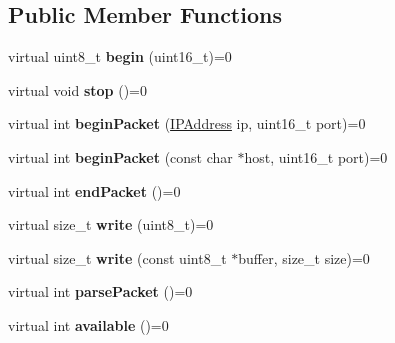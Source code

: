 \subsection*{Public Member Functions}
\begin{DoxyCompactItemize}
\item 
\hypertarget{class_u_d_p_afc18a5689a3dc92e5f5fb740e08ba1f9}{}virtual uint8\+\_\+t {\bfseries begin} (uint16\+\_\+t)=0\label{class_u_d_p_afc18a5689a3dc92e5f5fb740e08ba1f9}

\item 
\hypertarget{class_u_d_p_a0e4696e1b2e485970c0aca6216a1a4ac}{}virtual void {\bfseries stop} ()=0\label{class_u_d_p_a0e4696e1b2e485970c0aca6216a1a4ac}

\item 
\hypertarget{class_u_d_p_a41344aa0d287135b6dfa9b180e2e446b}{}virtual int {\bfseries begin\+Packet} (\hyperlink{class_i_p_address}{I\+P\+Address} ip, uint16\+\_\+t port)=0\label{class_u_d_p_a41344aa0d287135b6dfa9b180e2e446b}

\item 
\hypertarget{class_u_d_p_adb47bf5e8a65ed5240374b4036c69f3d}{}virtual int {\bfseries begin\+Packet} (const char $\ast$host, uint16\+\_\+t port)=0\label{class_u_d_p_adb47bf5e8a65ed5240374b4036c69f3d}

\item 
\hypertarget{class_u_d_p_ab3d794999eab13727b155da81f55858f}{}virtual int {\bfseries end\+Packet} ()=0\label{class_u_d_p_ab3d794999eab13727b155da81f55858f}

\item 
\hypertarget{class_u_d_p_ad913d57b20d77fdbfbc63a5646de345e}{}virtual size\+\_\+t {\bfseries write} (uint8\+\_\+t)=0\label{class_u_d_p_ad913d57b20d77fdbfbc63a5646de345e}

\item 
\hypertarget{class_u_d_p_afa7e3894d353b62c74b69e8cb39d303a}{}virtual size\+\_\+t {\bfseries write} (const uint8\+\_\+t $\ast$buffer, size\+\_\+t size)=0\label{class_u_d_p_afa7e3894d353b62c74b69e8cb39d303a}

\item 
\hypertarget{class_u_d_p_adab1e167381c58afcec04f40fb1c57e2}{}virtual int {\bfseries parse\+Packet} ()=0\label{class_u_d_p_adab1e167381c58afcec04f40fb1c57e2}

\item 
\hypertarget{class_u_d_p_a5598f32d2ca6a3222b00b1ff47e8136c}{}virtual int {\bfseries available} ()=0\label{class_u_d_p_a5598f32d2ca6a3222b00b1ff47e8136c}


\end{DoxyCompactItemize}
